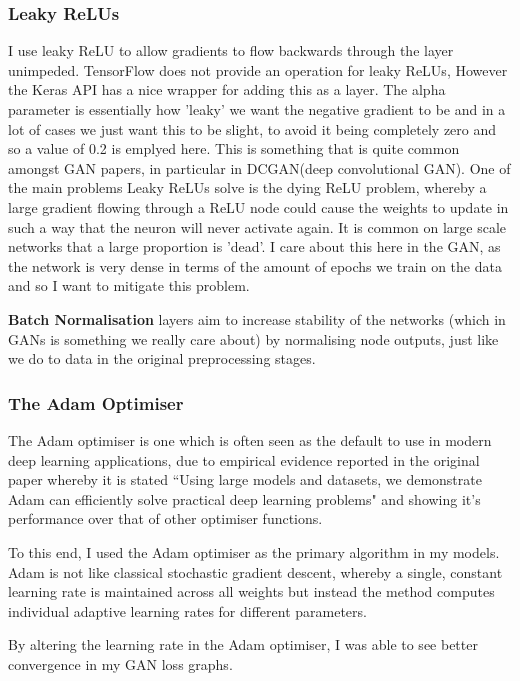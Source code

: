 \documentclass[12pt,a4paper,twoside]{report}
\begin{document}
\subsubsection{Leaky ReLUs}
I use leaky ReLU to allow gradients to flow backwards through the layer unimpeded. TensorFlow does not provide an operation for leaky ReLUs, However the Keras API has a nice wrapper for adding this as a layer. The alpha parameter is essentially how 'leaky' we want the negative gradient to be and in a lot of cases we just want this to be slight, to avoid it being completely zero and so a value of 0.2 is emplyed here. This is something that is quite common amongst GAN papers, in particular in DCGAN(deep convolutional GAN)\cite{DBLP:journals/corr/RadfordMC15}. One of the main problems Leaky ReLUs solve is the dying ReLU problem, whereby a large gradient flowing through a ReLU node could cause the weights to update in such a way that the neuron will never activate again. It is common on large scale networks that a large proportion is 'dead'. I care about this here in the GAN, as the network is very dense in terms of the amount of epochs we train on the data and so I want to mitigate this problem. 

\textbf{Batch Normalisation} layers aim to increase stability of the networks (which in GANs is something we really care about) by normalising node outputs, just like we do to data in the original preprocessing stages.

\subsubsection{The Adam Optimiser}
The Adam optimiser is one which is often seen as the default to use in modern deep learning applications, due to empirical evidence reported in the original paper\cite{DBLP:journals/corr/KingmaB14} whereby it is stated ``Using large models and datasets, we demonstrate Adam can efficiently solve practical deep learning problems" and showing it's performance over that of other optimiser functions. 

To this end, I used the Adam optimiser as the primary algorithm in my models. Adam is not like classical stochastic gradient descent, whereby a single, constant learning rate is maintained across all weights but instead the method computes individual adaptive learning rates for different parameters.

By altering the learning rate in the Adam optimiser, I was able to see better convergence in my GAN loss graphs. 
\end{document}
